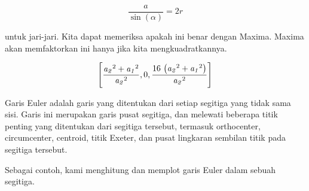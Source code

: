 \documentclass[a4paper,10pt]{article}
\begin{document}
\begin{eulernotebook}
\begin{eulercomment}
\begin{eulercomment}
\begin{eulercomment}
\begin{eulercomment}
\begin{eulercomment}
\begin{eulercomment}
\begin{eulercomment}
\begin{eulercomment}
\begin{eulercomment}
\begin{eulercomment}
\begin{eulercomment}
\begin{eulercomment}
\begin{eulercomment}
\begin{eulercomment}
\begin{eulercomment}
\begin{eulercomment}
\begin{eulercomment}
\begin{eulercomment}
\begin{eulercomment}
\begin{eulercomment}
\begin{eulercomment}
\begin{eulercomment}
\begin{eulercomment}
\begin{eulercomment}
\begin{eulercomment}
\begin{eulercomment}
\begin{eulercomment}
\begin{eulercomment}
\begin{eulercomment}
\begin{eulercomment}
\begin{eulercomment}
\end{eulercomment}
\begin{eulerformula}
\[
\frac{a}{\sin(\alpha)}=2r
\]
\end{eulerformula}
\begin{eulercomment}
untuk jari-jari. Kita dapat memeriksa apakah ini benar dengan Maxima.
Maxima akan memfaktorkan ini hanya jika kita mengkuadratkannya.
\end{eulercomment}
\begin{eulerformula}
\[
\left[ \frac{{\it a_2}^2+{\it a_1}^2}{{\it a_2}^2} , 0 , \frac{16\,
 \left({\it a_2}^2+{\it a_1}^2\right)}{{\it a_2}^2} \right] 
\]
\end{eulerformula}
\begin{eulercomment}
Garis Euler adalah garis yang ditentukan dari setiap segitiga yang
tidak sama sisi. Garis ini merupakan garis pusat segitiga, dan
melewati beberapa titik penting yang ditentukan dari segitiga
tersebut, termasuk orthocenter, circumcenter, centroid, titik Exeter,
dan pusat lingkaran sembilan titik pada segitiga tersebut.

Sebagai contoh, kami menghitung dan memplot garis Euler dalam sebuah
segitiga.


\end{eulercomment}
\end{eulercomment}
\end{eulercomment}
\end{eulercomment}
\end{eulercomment}
\end{eulercomment}
\end{eulercomment}
\end{eulercomment}
\end{eulercomment}
\end{eulercomment}
\end{eulercomment}
\end{eulercomment}
\end{eulercomment}
\end{eulercomment}
\end{eulercomment}
\end{eulercomment}
\end{eulercomment}
\end{eulercomment}
\end{eulercomment}
\end{eulercomment}
\end{eulercomment}
\end{eulercomment}
\end{eulercomment}
\end{eulercomment}
\end{eulercomment}
\end{eulercomment}
\end{eulercomment}
\end{eulercomment}
\end{eulercomment}
\end{eulercomment}
\end{eulercomment}
\end{eulernotebook}
\end{document}
